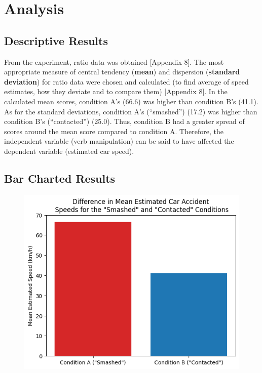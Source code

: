 \documentclass[12pt]{article}
\begin{document}
\pagebreak
\section{Analysis}
\subsection{Descriptive Results}
From the experiment, ratio data was obtained [Appendix 8]. The most appropriate measure of central tendency (\textbf{mean}) and dispersion (\textbf{standard deviation}) for ratio data were chosen and calculated (to find average of speed estimates, how they deviate and to compare them) [Appendix 8]. In the calculated mean scores, condition A's (66.6) was higher than condition B's (41.1). As for the standard deviations, condition A's (“smashed”) (17.2) was higher than condition B's (“contacted”) (25.0). Thus, condition B had a greater spread of scores around the mean score compared to condition A. Therefore, the independent variable (verb manipulation) can be said to have affected the dependent variable (estimated car speed). 

\subsection{Bar Charted Results}
\begin{figure}[H]
	\includegraphics{results}
	\centering
\end{figure}
\end{document}
